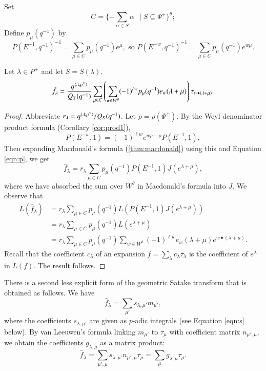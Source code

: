 Set
\[
C = \{  - \sum_{\alpha\in S}\alpha \ \ \mid S \subseteq \Psi^+ \}^\theta;
\]
Define $p_\mu(q^{-1})$ by
\begin{equation}\label{eqn:p}
 P(E^{-1},q^{-1})^{-1} = \sum_{\mu\in C} p_\mu(q^{-1}) e^{\mu},
\text{\ \ so }  P(E^{-w},q^{-1})^{-1} 
= \sum_{\mu\in C} p_\mu(q^{-1}) e^{w\mu}.
\end{equation}

\begin{theorem}\label{thm:gs}  
Let $\lambda\in P^+$ and let $S=S(\lambda)$.
\[
\hat f_\lambda = \frac{q^{\langle{\lambda,\rho^\vee}\rangle}}{Q_S(q^{-1})} 
\sum_{\mu\in C}\left(\sum_{w\in W^\theta} 
(-1)^{\ell w} p_{\mu}(q^{-1}) e_w(\lambda+\mu)\right)  
\tau_{w\bullet(\lambda+\mu)}.
\]
\end{theorem}

\begin{proof}
  Abbreviate $r_\lambda = q^{\langle{\lambda,\rho^\vee}\rangle}/Q_S(q^{-1})$.
  Let $\rho=\rho(\Psi^+)$.
  By the Weyl denominator product formula (Corollary \ref{cor:prod1}),
\begin{equation}
P(E^{-w},1) = (-1)^{\ell w} e^{w\rho - \rho} P(E^{-1},1),
\end{equation}
Then expanding Macdonald's formula (\ref{thm:macdonald}) using this and Equation
\ref{eqn:p}, we get
\[
\hat f_\lambda = r_\lambda \sum_{\mu\in C} p_\mu(q^{-1}) P(E^{-1},1) J (e^{\lambda+\mu}),
\]
where we have absorbed the sum over $W^\theta$ in Macdonald's formula
into $J$.  We observe that
\begin{align*}
L(\hat f_\lambda) &= r_\lambda 
\sum_{\mu\in C} p_\mu(q^{-1}) L(P(E^{-1},1) J(e^{\lambda+\mu})) \\
&= 
r_\lambda \sum_{\mu\in C} p_\mu(q^{-1}) L(e^{\lambda+\mu}) \\
&= 
r_\lambda
\sum_{\mu\in C} p_\mu(q^{-1}) 
\sum_{w\in W^\theta} (-1)^{\ell w} e_w(\lambda+\mu) e^{w\bullet (\lambda+\mu)}.
\end{align*}
Recall that the coefficient $c_\lambda$ of an expansion $f =
\sum_\lambda c_\lambda\tau_\lambda$ is the coefficient of $e^\lambda$
in $L(f)$.  The result follows.
\end{proof}

There is a second less explicit form of the geometric Satake transform
that is obtained as follows.  We have
\[
\hat f_\lambda = \sum_{\mu'} s_{\lambda,\mu'} m_{\mu'},
\]
where the coefficients $s_{\lambda,\mu'}$ are given as $p$-adic
integrals (see Equation \ref{eqn:s} below).  By van Leeuwen's formula
linking $m_{\mu'}$ to $\tau_\mu$ with coefficient matrix
$n_{\mu',\mu}$, we obtain the coefficients $g_{\lambda,\mu}$ as a
matrix product:
\begin{equation}
\hat f_\lambda 
= \sum_{\mu',\mu} s_{\lambda,\mu'} n_{\mu',\mu}
\tau_{\mu} 
= \sum_{\mu} g_{\lambda,\mu} \tau_\mu.
\end{equation}

